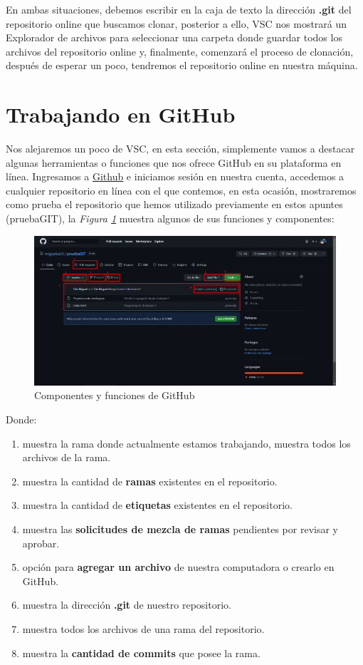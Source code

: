 En ambas situaciones, debemos escribir en la caja de texto la dirección \textbf{.git} del repositorio online que buscamos clonar, posterior a ello, VSC nos mostrará un Explorador de archivos para seleccionar una carpeta donde guardar todos los archivos del repositorio online y, finalmente, comenzará el proceso de clonación, después de esperar un poco, tendremos el repositorio online en nuestra máquina.



\section{Trabajando en GitHub}

Nos alejaremos un poco de VSC, en esta sección, simplemente vamos a destacar algunas herramientas o funciones que nos ofrece GitHub en su plataforma en línea. Ingresamos a \href{https://github.com/}{Github} e iniciamos sesión en nuestra cuenta, accedemos a cualquier repositorio en línea con el que contemos, en esta ocasión, mostraremos como prueba el repositorio que hemos utilizado previamente en estos apuntes (pruebaGIT), la \textit{Figura \ref{fig: 34}} muestra algunos de sus funciones y componentes:
\begin{figure}[H]
    \centering
    \caption{Componentes y funciones de GitHub}
    \label{fig: 34}
    \includegraphics[width=\textwidth]{capturas/github.png}
\end{figure}

Donde:
\begin{enumerate}
    \item muestra la rama donde actualmente estamos trabajando, muestra todos los archivos de la rama.
    \item muestra la cantidad de \textbf{ramas} existentes en el repositorio.
    \item muestra la cantidad de \textbf{etiquetas} existentes en el repositorio.
    \item muestra las \textbf{solicitudes de mezcla de ramas} pendientes por revisar y aprobar.
    \item opción para \textbf{agregar un archivo} de nuestra computadora o crearlo en GitHub.
    \item muestra la dirección \textbf{.git} de nuestro repositorio.
    \item muestra todos los archivos de una rama del repositorio.
    \item muestra la \textbf{cantidad de commits} que posee la rama.
\end{enumerate}



